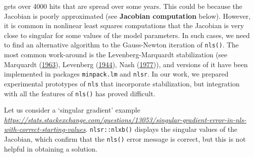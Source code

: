 \documentclass[
]{article}
\begin{document}
gets over 4000 hits that are spread over some years. This could be
because the Jacobian is poorly approximated (see \textbf{Jacobian
computation} below). However, it is common in nonlinear least squares
computations that the Jacobian is very close to singular for some values
of the model parameters. In such cases, we need to find an alternative
algorithm to the Gauss-Newton iteration of \texttt{nls()}. The most
common work-around is the Levenberg-Marquardt stabilization (see
Marquardt (\protect\hyperlink{ref-Marquardt1963}{1963}), Levenberg
(\protect\hyperlink{ref-Levenberg1944}{1944}), Nash
(\protect\hyperlink{ref-jn77ima}{1977})), and versions of it have been
implemented in packages \texttt{minpack.lm} and \texttt{nlsr}. In our
work, we prepared experimental prototypes of \texttt{nls} that
incorporate stabilization, but integration with all the features of
\texttt{nls()} has proved difficult.

Let us consider a `singular gradient' example
\emph{\url{https://stats.stackexchange.com/questions/13053/singular-gradient-error-in-nls-with-correct-starting-values}}.
\texttt{nlsr::nlxb()} displays the singular values of the Jacobian,
which confirm that the \texttt{nls()} error message is correct, but this
is not helpful in obtaining a solution.
\end{document}
